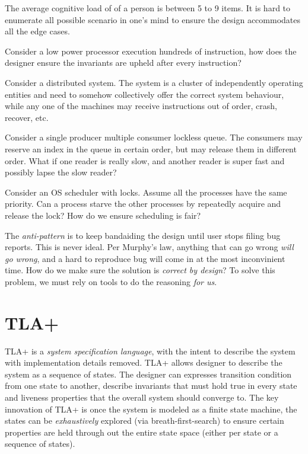 The average cognitive load of of a person is between 5 to 9 items. It is hard to
enumerate all possible scenario in one's mind to ensure the design accommodates
all the edge cases.\newline

Consider a low power processor execution hundreds of instruction, how does the 
designer ensure the invariants are upheld after every instruction?\newline

Consider a distributed system. The system is a cluster of independently
operating entities and need to somehow collectively offer the correct system
behaviour, while any one of the machines may receive instructions out of order,
crash, recover, etc. \newline

Consider a single producer multiple consumer lockless queue. The consumers may 
reserve an index in the queue in certain order, but may release them in different order. 
What if one reader is really slow, and another reader is super fast and possibly 
lapse the slow reader? \newline

Consider an OS scheduler with locks. Assume all the processes have the same
priority. Can a process starve the other processes by repeatedly acquire and
release the lock? How do we ensure scheduling is fair?\newline


The \textit{anti-pattern} is to keep bandaiding the design until user stops
filing bug reports. This is never ideal. Per Murphy's law, anything that can go
wrong \textit{will go wrong}, and a hard to reproduce bug will come in at the
most inconvinient time. How do we make sure the solution is \textit{correct by
design}? To solve this problem, we must rely on tools to do the reasoning
\textit{for us}.

\section{TLA+}

TLA+ is a \textit{system specification language}, with the intent to describe
the system with implementation details removed. TLA+ allows designer to describe
the system as a sequence of states. The designer can expresses transition
condition from one state to another, describe invariants that must hold true in
every state and liveness properties that the overall system should converge to.
The key innovation of TLA+ is once the system is modeled as a finite state
machine, the states can be \textit{exhaustively} explored (via
breath-first-search) to ensure certain properties are held through out the
entire state space (either per state or a sequence of states).\newline

